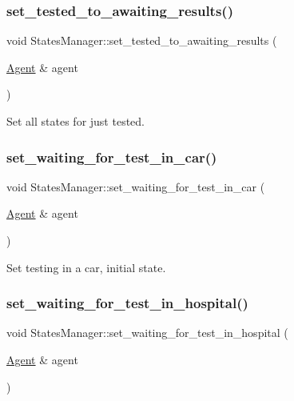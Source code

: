 \subsubsection{\texorpdfstring{set\+\_\+tested\+\_\+to\+\_\+awaiting\+\_\+results()}{set\_tested\_to\_awaiting\_results()}}
{\footnotesize\ttfamily void States\+Manager\+::set\+\_\+tested\+\_\+to\+\_\+awaiting\+\_\+results (\begin{DoxyParamCaption}\item[{\hyperlink{classAgent}{Agent} \&}]{agent }\end{DoxyParamCaption})}



Set all states for just tested. 

\mbox{\label{classStatesManager_a280373c96ad5df8a9044235be2351556}} 
\subsubsection{\texorpdfstring{set\+\_\+waiting\+\_\+for\+\_\+test\+\_\+in\+\_\+car()}{set\_waiting\_for\_test\_in\_car()}}
{\footnotesize\ttfamily void States\+Manager\+::set\+\_\+waiting\+\_\+for\+\_\+test\+\_\+in\+\_\+car (\begin{DoxyParamCaption}\item[{\hyperlink{classAgent}{Agent} \&}]{agent }\end{DoxyParamCaption})}



Set testing in a car, initial state. 

\mbox{\label{classStatesManager_ac3900f6b45182c5ba0103bb524df769a}} 
\subsubsection{\texorpdfstring{set\+\_\+waiting\+\_\+for\+\_\+test\+\_\+in\+\_\+hospital()}{set\_waiting\_for\_test\_in\_hospital()}}
{\footnotesize\ttfamily void States\+Manager\+::set\+\_\+waiting\+\_\+for\+\_\+test\+\_\+in\+\_\+hospital (\begin{DoxyParamCaption}\item[{\hyperlink{classAgent}{Agent} \&}]{agent }\end{DoxyParamCaption})}



